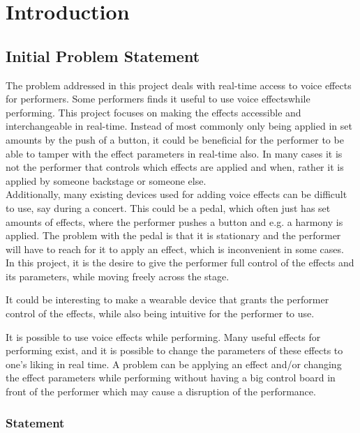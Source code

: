 \chapter{Introduction}\label{ch:Intro}

\section{Initial Problem Statement}

The problem addressed in this project deals with real-time access to voice effects for performers. 
Some performers finds it useful to use voice effectswhile performing. This project focuses on making the effects accessible and interchangeable in real-time. Instead of most commonly only being applied in set amounts by the push of a button, it could be beneficial for the performer to be able to tamper with the effect parameters in real-time also. In many cases it is not the performer that controls which effects are applied and when, rather it is applied by someone backstage or someone else. \\

Additionally, many existing devices used for adding voice effects can be difficult to use, say during a concert. This could be a pedal, which often just has set amounts of effects, where the performer pushes a button and e.g. a harmony is applied. The problem with the pedal is that it is stationary and the performer will have to reach for it to apply an effect, which is inconvenient in some cases.\\

In this project, it is the desire to give the performer full control of the effects and its parameters, while moving freely across the stage.

It could be interesting to make a wearable device that grants the performer control of the effects, while also being intuitive for the performer to use.


It is possible to use voice effects while performing. Many useful effects for performing exist, and it is possible to change the parameters of these effects to one's liking in real time. 
A problem can be applying an effect and/or changing the effect parameters while performing without having a big control board in front of the performer which may cause a disruption of the performance.


\subsection{Statement}

